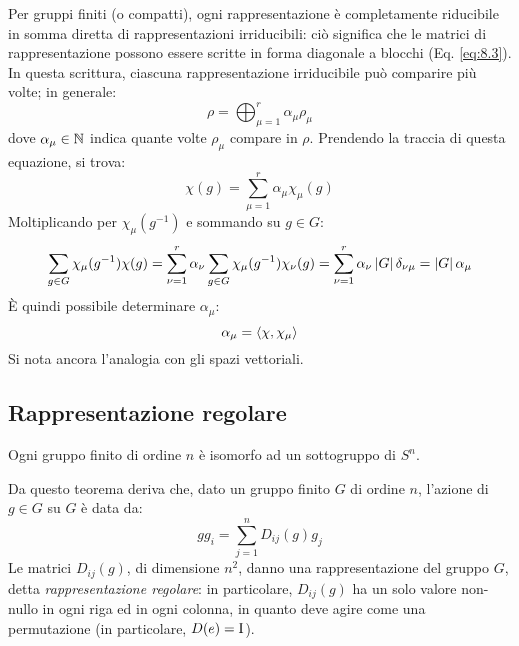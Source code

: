 Per gruppi finiti (o compatti), ogni rappresentazione è completamente riducibile in somma diretta di rappresentazioni irriducibili: ciò significa che le matrici di rappresentazione possono essere scritte in forma diagonale a blocchi (Eq. \ref{eq:8.3}). In questa scrittura, ciascuna rappresentazione irriducibile può comparire più volte; in generale:
\begin{equation}
	\rho = \bigoplus_{\mu = 1}^{r} \alpha_{\mu} \rho_{\mu}
	\label{eq:8.13}
\end{equation}
dove $ \alpha_{\mu} \in \mathbb{N} $ indica quante volte $ \rho_{\mu} $ compare in $ \rho $. Prendendo la traccia di questa equazione, si trova:
\begin{equation}
	\chi(g) = \sum_{\mu = 1}^{r} \alpha_{\mu} \chi_{\mu}(g)
	\label{eq:8.14}
\end{equation}
Moltiplicando per $ \chi_{\mu}(g^{-1}) $ e sommando su $ g \in G $:
\begin{equation*}
	\sum_{g \in G} \chi_{\mu}(g^{-1}) \chi(g) = \sum_{\nu = 1}^{r} \alpha_{\nu} \sum_{g \in G} \chi_{\mu}(g^{-1}) \chi_{\nu}(g) = \sum_{\nu = 1}^{r} \alpha_{\nu} \left\lvert G\right\rvert \delta_{\nu \mu} = \left\lvert G\right\rvert \alpha_{\mu}
\end{equation*}
È quindi possibile determinare $ \alpha_{\mu} $:
\begin{equation}
	\alpha_{\mu} = \braket{\chi,\chi_{\mu}}
	\label{eq:8.15}
\end{equation}
Si nota ancora l'analogia con gli spazi vettoriali.

\subsection{Rappresentazione regolare}

\begin{theorem}[Cayley]
	Ogni gruppo finito di ordine $ n $ è isomorfo ad un sottogruppo di $ S^n $.
\end{theorem}

Da questo teorema deriva che, dato un gruppo finito $ G $ di ordine $ n $, l'azione di $ g \in G $ su $ G $ è data da:
\begin{equation}
	gg_i = \sum_{j = 1}^{n} D_{ij}(g) g_j
	\label{eq:8.16}
\end{equation}
Le matrici $ D_{ij}(g) $, di dimensione $ n^2 $, danno una rappresentazione del gruppo $ G $, detta \textit{rappresentazione regolare}: in particolare, $ D_{ij}(g) $ ha un solo valore non-nullo in ogni riga ed in ogni colonna, in quanto deve agire come una permutazione (in particolare, $ D(e) = \mathrm{I} $).

